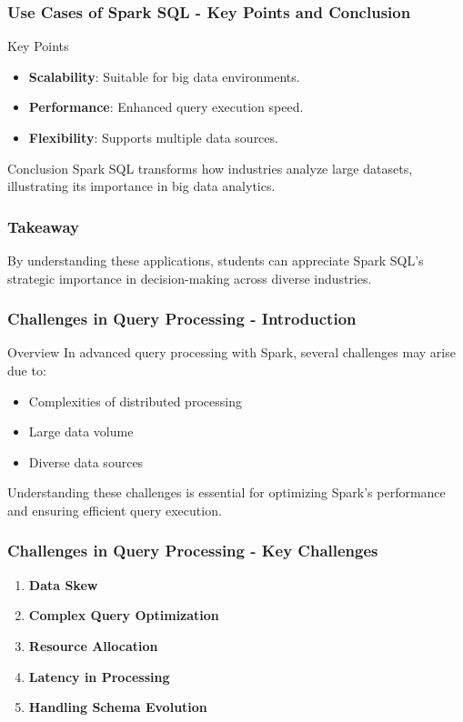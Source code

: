 \documentclass[aspectratio=169]{beamer}
\begin{document}
\begin{frame}[fragile]
    \frametitle{Use Cases of Spark SQL - Key Points and Conclusion}
    \begin{block}{Key Points}
        \begin{itemize}
            \item \textbf{Scalability}: Suitable for big data environments.
            \item \textbf{Performance}: Enhanced query execution speed.
            \item \textbf{Flexibility}: Supports multiple data sources.
        \end{itemize}
    \end{block}
    \begin{block}{Conclusion}
        Spark SQL transforms how industries analyze large datasets, illustrating its importance in big data analytics.
    \end{block}
\end{frame}

\begin{frame}
    \frametitle{Takeaway}
    By understanding these applications, students can appreciate Spark SQL's strategic importance in decision-making across diverse industries.
\end{frame}

\begin{frame}[fragile]
    \frametitle{Challenges in Query Processing - Introduction}
    \begin{block}{Overview}
        In advanced query processing with Spark, several challenges may arise due to:
        \begin{itemize}
            \item Complexities of distributed processing
            \item Large data volume
            \item Diverse data sources
        \end{itemize}
        Understanding these challenges is essential for optimizing Spark's performance and ensuring efficient query execution.
    \end{block}
\end{frame}

\begin{frame}[fragile]
    \frametitle{Challenges in Query Processing - Key Challenges}
    \begin{enumerate}
        \item \textbf{Data Skew}
        \item \textbf{Complex Query Optimization}
        \item \textbf{Resource Allocation}
        \item \textbf{Latency in Processing}
        \item \textbf{Handling Schema Evolution}
    \end{enumerate}
\end{frame}
\end{document}
